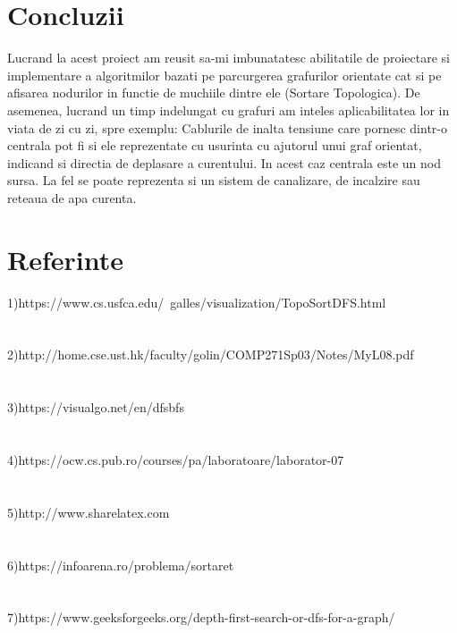 \documentclass[14pt]{article}
\begin{document}
\vspace{40 mm}
\section*{Concluzii}
\vspace{20 mm}
Lucrand la acest proiect am reusit sa-mi imbunatatesc abilitatile de proiectare si implementare a algoritmilor bazati pe parcurgerea grafurilor orientate cat si pe afisarea nodurilor in functie de muchiile dintre ele (Sortare Topologica). De asemenea, lucrand un timp indelungat cu grafuri am inteles aplicabilitatea lor in viata de zi cu zi, spre exemplu: Cablurile de inalta tensiune care pornesc dintr-o centrala pot fi si ele reprezentate cu usurinta cu ajutorul unui graf orientat, indicand si directia de deplasare a curentului. In acest caz centrala este un nod sursa. La fel se poate reprezenta si un sistem de canalizare, de incalzire sau reteaua de apa curenta.
\\\vspace{20mm}
\newpage
\section*{Referinte}
\large 
1)https://www.cs.usfca.edu/~galles/visualization/TopoSortDFS.html
\\
\\\vspace{6mm}
\\
2)http://home.cse.ust.hk/faculty/golin/COMP271Sp03/Notes/MyL08.pdf
\\
\\\vspace{6mm}
\\
3)https://visualgo.net/en/dfsbfs
\\
\\\vspace{6mm}
\\
4)https://ocw.cs.pub.ro/courses/pa/laboratoare/laborator-07
\\
\\\vspace{6mm}
\\
5)http://www.sharelatex.com
\\
\\\vspace{6mm}
\\
6)https://infoarena.ro/problema/sortaret
\\
\\\vspace{6mm}
\\
7)https://www.geeksforgeeks.org/depth-first-search-or-dfs-for-a-graph/
\end{document}

